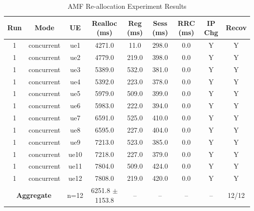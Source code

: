 \begin{table}[ht]
\centering
\begin{tabular}{|c|c|c|c|c|c|c|c|c|}
\hline
Run & Mode & UE & Realloc (ms) & Reg (ms) & Sess (ms) & RRC (ms) & IP Chg & Recov \\
\hline
1 & concurrent & ue1 & 4271.0 & 11.0 & 298.0 & 0.0 & Y & Y \\
1 & concurrent & ue2 & 4779.0 & 219.0 & 398.0 & 0.0 & Y & Y \\
1 & concurrent & ue3 & 5389.0 & 532.0 & 381.0 & 0.0 & Y & Y \\
1 & concurrent & ue4 & 5392.0 & 223.0 & 378.0 & 0.0 & Y & Y \\
1 & concurrent & ue5 & 5979.0 & 509.0 & 399.0 & 0.0 & Y & Y \\
1 & concurrent & ue6 & 5983.0 & 222.0 & 394.0 & 0.0 & Y & Y \\
1 & concurrent & ue7 & 6591.0 & 525.0 & 410.0 & 0.0 & Y & Y \\
1 & concurrent & ue8 & 6595.0 & 227.0 & 404.0 & 0.0 & Y & Y \\
1 & concurrent & ue9 & 7213.0 & 523.0 & 385.0 & 0.0 & Y & Y \\
1 & concurrent & ue10 & 7218.0 & 227.0 & 379.0 & 0.0 & Y & Y \\
1 & concurrent & ue11 & 7804.0 & 509.0 & 424.0 & 0.0 & Y & Y \\
1 & concurrent & ue12 & 7808.0 & 219.0 & 420.0 & 0.0 & Y & Y \\
\multicolumn{2}{|c|}{\textbf{Aggregate}} & n=12 & 6251.8 $\pm$ 1153.8 & -- & -- & -- & -- & 12/12 \\
\hline
\end{tabular}
\caption{AMF Re-allocation Experiment Results}
\label{tab:amf_realloc}
\end{table}
